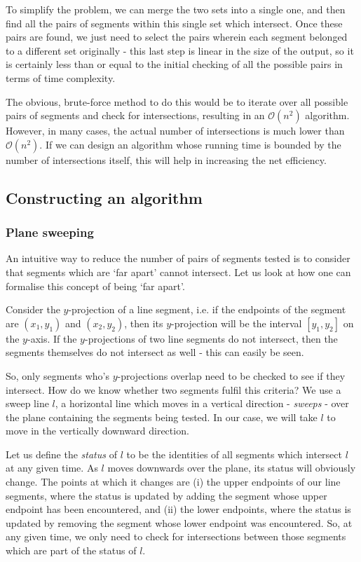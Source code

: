 \documentclass{article}
\begin{document}
To simplify the problem, we can merge the two sets into a single one, and then find all the pairs of segments within this single set which intersect. Once these pairs are found, we just need to select the pairs wherein each segment belonged to a different set originally - this last step is linear in the size of the output, so it is certainly less than or equal to the initial checking of all the possible pairs in terms of time complexity.

The obvious, brute-force method to do this would be to iterate over all possible pairs of segments and check for intersections, resulting in an $\mathcal{O}(n^2)$ algorithm. However, in many cases, the actual number of intersections is much lower than $\mathcal{O}(n^2)$. If we can design an algorithm whose running time is bounded by the number of intersections itself, this will help in increasing the net efficiency.

\subsection{Constructing an algorithm}

\subsubsection{Plane sweeping}

An intuitive way to reduce the number of pairs of segments tested is to consider that segments which are `far apart' cannot intersect. Let us look at how one can formalise this concept of being `far apart'.

Consider the $y$-projection of a line segment, i.e. if the endpoints of the segment are $(x_1,y_1)$ and $(x_2,y_2)$, then its $y$-projection will be the interval $[y_1,y_2]$ on the $y$-axis. If the $y$-projections of two line segments do not intersect, then the segments themselves do not intersect as well - this can easily be seen.

So, only segments who's $y$-projections overlap need to be checked to see if they intersect. How do we know whether two segments fulfil this criteria? We use a sweep line $l$, a horizontal line which moves in a vertical direction - \emph{sweeps} - over the plane containing the segments being tested. In our case, we will take $l$ to move in the vertically downward direction.

Let us define the \emph{status} of $l$ to be the identities of all segments which intersect $l$ at any given time. As $l$ moves downwards over the plane, its status will obviously change. The points at which it changes are (i) the upper endpoints of our line segments, where the status is updated by adding the segment whose upper endpoint has been encountered, and (ii) the lower endpoints, where the status is updated by removing the segment whose lower endpoint was encountered. So, at any given time, we only need to check for intersections between those segments which are part of the status of $l$.
\end{document}
